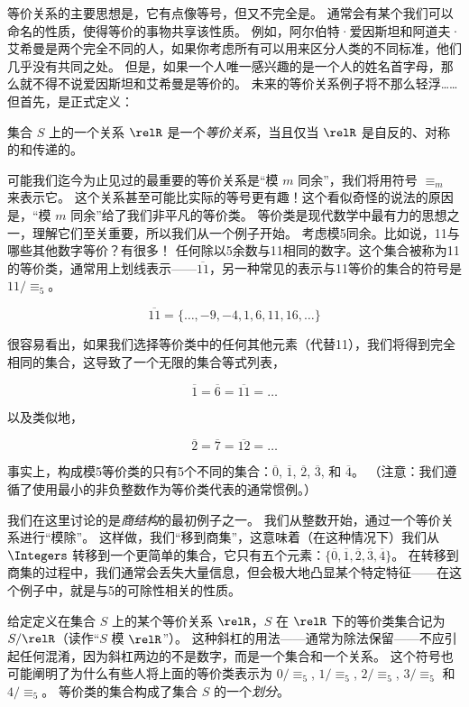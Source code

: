 等价关系的主要思想是，它有点像等号，但又不完全是。
通常会有某个我们可以命名的性质，使得等价的事物共享该性质。
例如，阿尔伯特·爱因斯坦和阿道夫·艾希曼是两个完全不同的人，如果你考虑所有可以用来区分人类的不同标准，他们几乎没有共同之处。
但是，如果一个人唯一感兴趣的是一个人的姓名首字母，那么就不得不说爱因斯坦和艾希曼是等价的。
未来的等价关系例子将不那么轻浮……但首先，是正式定义：

\begin{defi} 集合 $S$ 上的一个关系 $\relR$ 是一个\emph{等价关系}，当且仅当 $\relR$ 是自反的、对称的和传递的。
\end{defi}

可能我们迄今为止见过的最重要的等价关系是“模 $m$ 同余”，我们将用符号 $\equiv_m$ 来表示它。
这个关系甚至可能比实际的等号更有趣！这个看似奇怪的说法的原因是，“模 $m$ 同余”给了我们非平凡的等价类。
等价类是现代数学中最有力的思想之一，理解它们至关重要，所以我们从一个例子开始。
考虑模5同余。比如说，11与哪些其他数字等价？有很多！
任何除以5余数与11相同的数字。这个集合被称为11的等价类，通常用上划线表示——$\overline{11}$，另一种常见的表示与11等价的集合的符号是$11/\equiv_5$。

\[ \overline{11} = \{ \ldots, -9, -4, 1, 6, 11, 16, \ldots \} \]

很容易看出，如果我们选择等价类中的任何其他元素（代替11），我们将得到完全相同的集合，这导致了一个无限的集合等式列表，

\[   \overline{1} = \overline{6} = \overline{11} = \ldots \]

\noindent 以及类似地，

\[   \overline{2} = \overline{7} = \overline{12} = \ldots \]

\noindent 事实上，构成模5等价类的只有5个不同的集合：$\overline{0}$, $\overline{1}$, $\overline{2}$, $\overline{3}$, 和 $\overline{4}$。
（注意：我们遵循了使用最小的非负整数作为等价类代表的通常惯例。）

我们在这里讨论的是\emph{商结构}的最初例子之一。
我们从整数开始，通过一个等价关系进行“模除”。
这样做，我们“移到商集”，这意味着（在这种情况下）我们从 $\Integers$ 转移到一个更简单的集合，它只有五个元素：$\{ \overline{0}, \overline{1}, \overline{2}, \overline{3}, \overline{4} \}$。
在转移到商集的过程中，我们通常会丢失大量信息，但会极大地凸显某个特定特征——在这个例子中，就是与5的可除性相关的性质。

给定定义在集合 $S$ 上的某个等价关系 $\relR$，$S$ 在 $\relR$ 下的等价类集合记为 $S/\relR$（读作“$S$ 模 $\relR$”）。
这种斜杠的用法——通常为除法保留——不应引起任何混淆，因为斜杠两边的不是数字，而是一个集合和一个关系。
这个符号也可能阐明了为什么有些人将上面的等价类表示为 $0/\equiv_5$, $1/\equiv_5$, $2/\equiv_5$, $3/\equiv_5$ 和 $4/\equiv_5$。
等价类的集合构成了集合 $S$ 的一个\emph{划分}。

